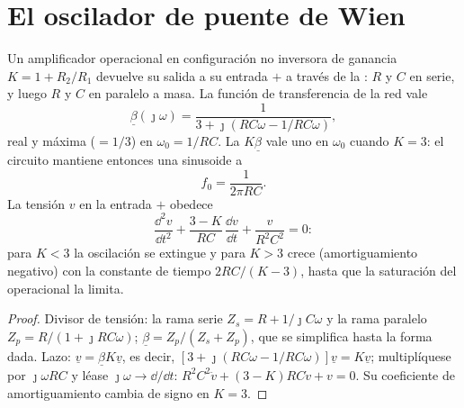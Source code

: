 \section{El oscilador de puente de Wien}

\begin{proposition}\label{prop:b2:feedback-oscillators:wien}
Un amplificador operacional en configuración no inversora de ganancia
$K = 1 + R_2/R_1$ devuelve su salida a su entrada $+$ a través de la
\emph{}: $R$ y $C$ en serie, y luego $R$ y $C$ en paralelo a
masa. La función de transferencia de la red vale
\[
\underline\beta(\jmath\omega) = \frac1{3 + \jmath(RC\omega - 1/RC\omega)} ,
\]
real y máxima ($= 1/3$) en $\omega_0 = 1/RC$. La  $K\underline\beta$
vale uno en $\omega_0$ cuando $K = 3$: el circuito mantiene entonces una
sinusoide a
\[
f_0 = \frac1{2\pi RC} .
\]
La tensión $v$ en la entrada $+$ obedece
\[
\frac{\dd^2v}{\dd t^2} + \frac{3 - K}{RC}\,\frac{\dd v}{\dd t} + \frac{v}{R^2C^2} = 0 :
\]
para $K < 3$ la oscilación se extingue y para $K > 3$ crece
(amortiguamiento negativo) con la constante de tiempo $2RC/(K - 3)$, hasta
que la saturación del operacional la limita.
\end{proposition}

\begin{proof}
Divisor de tensión: la rama serie $Z_s = R + 1/\jmath C\omega$ y la rama
paralelo $Z_p = R/(1 + \jmath RC\omega)$; $\underline\beta = Z_p/(Z_s + Z_p)$, que se
simplifica hasta la forma dada. Lazo: $\underline v = \underline\beta K\underline v$, es decir,
$[3 + \jmath(RC\omega - 1/RC\omega)]\underline v = K\underline v$; multiplíquese por $\jmath\omega RC$
y léase $\jmath\omega \to \dd/\dd t$: $R^2C^2\ddot v + (3 - K)RC\dot v + v = 0$.
Su coeficiente de amortiguamiento cambia de signo en $K = 3$.
\end{proof}


